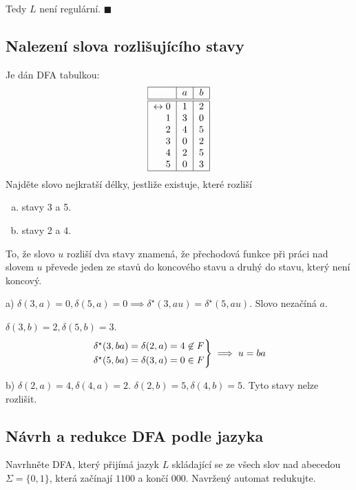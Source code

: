 Tedy $L$ není regulární. $\blacksquare$

\subsection{Nalezení slova rozlišujícího stavy}
Je dán DFA tabulkou:
\[
\begin{tabular}{|r|c|c|}
    \hline
    & $a$ & $b$\\
    \hline
    \hline
    $\leftrightarrow 0$& $1$ & $2$\\
    $1$                & $3$ & $0$\\
    $2$                & $4$ & $5$\\
    $3$                & $0$ & $2$\\
    $4$                & $2$ & $5$\\
    $5$                & $0$ & $3$\\
    \hline
\end{tabular}
\]
Najděte slovo nejkratší délky, jestliže existuje, které rozliší
\begin{enumerate}[a), noitemsep]
    \item stavy 3 a 5.
    \item stavy 2 a 4.
\end{enumerate}
To, že slovo $u$ rozliší dva stavy znamená, že přechodová funkce při práci nad slovem $u$ převede jeden ze stavů do 
koncového stavu a druhý do stavu, který není koncový.

a) $\delta(3,a) = 0, \delta(5,a)=0 \implies \delta^\star(3, au) = \delta^\star (5, au)$.
Slovo nezačíná $a$.

$\delta(3,b) = 2, \delta(5, b) = 3$.
\[
\begin{rcases*}
\delta^\star(3,ba) = \delta(2,a) = 4 \not\in F\\
\delta^\star(5,ba) = \delta(3,a) = 0 \in F
\end{rcases*} \implies u = ba
\]

b) $\delta(2,a) = 4, \delta(4,a) =2$. $\delta(2,b)=5, \delta(4,b)=5$. Tyto stavy nelze rozlišit.

\subsection{Návrh a redukce DFA podle jazyka}
Navrhněte DFA, který přijímá jazyk $L$ skládající se ze všech slov nad abecedou $\Sigma = \{0, 1\}$, která začínají 
$1100$ a končí $000$. Navržený automat redukujte.

